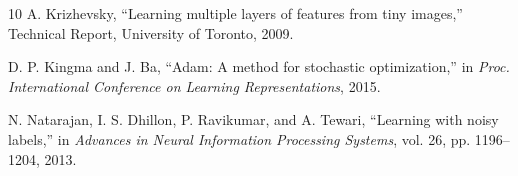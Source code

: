 \documentclass[journal]{IEEEtran}
\begin{document}
\begin{thebibliography}{10}
A. Krizhevsky,
``Learning multiple layers of features from tiny images,''
Technical Report, University of Toronto, 2009.

D. P. Kingma and J. Ba,
``Adam: A method for stochastic optimization,''
in \textit{Proc. International Conference on Learning Representations},
2015.

N. Natarajan, I. S. Dhillon, P. Ravikumar, and A. Tewari,
``Learning with noisy labels,''
in \textit{Advances in Neural Information Processing Systems},
vol. 26, pp. 1196--1204, 2013.

\end{thebibliography}
\end{document}
